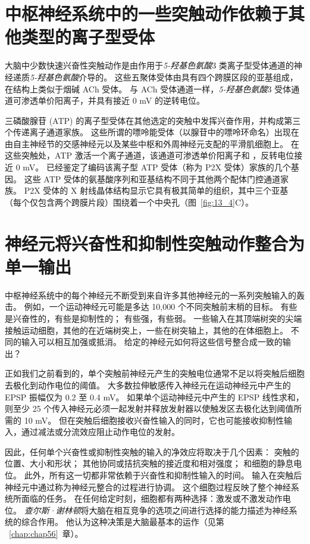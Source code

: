 \section{中枢神经系统中的一些突触动作依赖于其他类型的离子型受体}

大脑中少数快速兴奋性突触动作是由作用于\textit{5-羟基色氨酸}3 类离子型受体通道的神经递质\textit{5-羟基色氨酸}介导的。
这些五聚体受体由具有四个跨膜区段的亚基组成，在结构上类似于烟碱 ACh 受体。
与 ACh 受体通道一样，\textit{5-羟基色氨酸}3 受体通道可渗透单价阳离子，并具有接近 0 mV 的逆转电位。


三磷酸腺苷 (ATP) 的离子型受体在其他选定的突触中发挥兴奋作用，并构成第三个传递离子通道家族。
这些所谓的嘌呤能受体（以腺苷中的嘌呤环命名）出现在由自主神经节的交感神经元以及某些中枢和外周神经元支配的平滑肌细胞上。
在这些突触处，ATP 激活一个离子通道，该通道可渗透单价阳离子和 ，反转电位接近 0 mV。
已经鉴定了编码该离子型 ATP 受体（称为 P2X 受体）家族的几个基因。
这些 ATP 受体的氨基酸序列和亚基结构不同于其他两个配体门控通道家族。
P2X 受体的 X 射线晶体结构显示它具有极其简单的组织，其中三个亚基（每个仅包含两个跨膜片段）围绕着一个中央孔（图~\ref{fig:13_4}C）。



\section{神经元将兴奋性和抑制性突触动作整合为单一输出}

中枢神经系统中的每个神经元不断受到来自许多其他神经元的一系列突触输入的轰击。
例如，一个运动神经元可能是多达 10,000 个不同突触前末梢的目标。
有些是兴奋性的，有些是抑制性的；
有些强，有些弱。
一些输入在其顶端树突的尖端接触运动细胞，其他的在近端树突上，一些在树突轴上，其他的在体细胞上。
不同的输入可以相互加强或抵消。
给定的神经元如何将这些信号整合成一致的输出？


正如我们之前看到的，单个突触前神经元产生的突触电位通常不足以将突触后细胞去极化到动作电位的阈值。
大多数拉伸敏感传入神经元在运动神经元中产生的 EPSP 振幅仅为 0.2 至 0.4 mV。
如果单个运动神经元中产生的 EPSP 线性求和，则至少 25 个传入神经元必须一起发射并释放发射器以使触发区去极化达到阈值所需的 10 mV。
但在突触后细胞接收兴奋性输入的同时，它也可能接收抑制性输入，通过减法或分流效应阻止动作电位的发射。


因此，任何单个兴奋性或抑制性突触的输入的净效应将取决于几个因素：
突触的位置、大小和形状；
其他协同或拮抗突触的接近度和相对强度；
和细胞的静息电位。 
此外，所有这一切都非常依赖于兴奋性和抑制性输入的时间。
输入在突触后神经元中通过称为神经元整合的过程进行协调。
这个细胞过程反映了整个神经系统所面临的任务。
在任何给定时刻，细胞都有两种选择：激发或不激发动作电位。
\textit{查尔斯·谢林顿}将大脑在相互竞争的选项之间进行选择的能力描述为神经系统的综合作用。
他认为这种决策是大脑最基本的运作（见第 ~\ref{chap:chap56}~章）。



